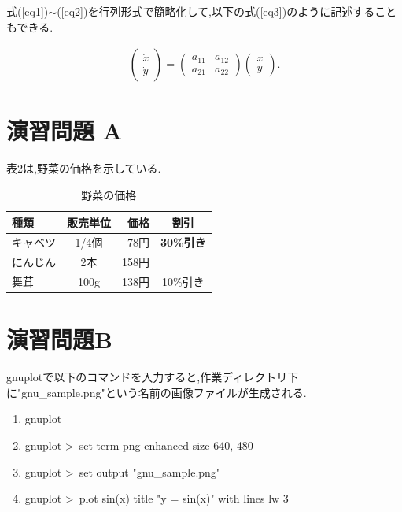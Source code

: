 \documentclass[a4paper, 11pt, titlepage]{jsarticle}
\begin{document}
式(\ref{eq1})$\sim $(\ref{eq2})を行列形式で簡略化して,以下の式(\ref{eq3})のように記述することもできる.

\begin{align}
    \left(    \begin{array}{c}
                    \dot{x} \\
                    \dot{y}
                \end{array} \right)
    =
    \left(    \begin{array}{cc}
                   a_{11} & a_{12} \\
                   a_{21} & a_{22}
               \end{array} \right)
    \left(    \begin{array}{c}
                   x \\
                   y
               \end{array} \right)    . \label{eq3}
\end{align}

\section{演習問題 A}
表2は,野菜の価格を示している.
\begin{table}[htbp]
\caption{野菜の価格}
\label{tabel1}
       \centering
	\begin{tabular}{|l| |c|r|c|}
           \hline
           種類 & 販売単位 & 価格 & 割引\\
           \hline
           キャベツ & 1/4個& 78円& \textbf{30\%引き}\\
           にんじん & 2本& 158円& \\
           舞茸& 100g& 138円& 10\%引き\\
           \hline
       \end{tabular}
\end{table}

\section{演習問題B}
gnuplotで以下のコマンドを入力すると,作業ディレクトリ下に"gnu\_sample.png"という名前の画像ファイルが生成される.

\begin{enumerate}
\item gnuplot
\item gnuplot \textgreater \ set term png enhanced size 640, 480
\item gnuplot \textgreater \ set output "gnu\_sample.png"   
\item gnuplot \textgreater \ plot sin(x) title "y = sin(x)" with lines lw 3
\end{enumerate}
\end{document}
